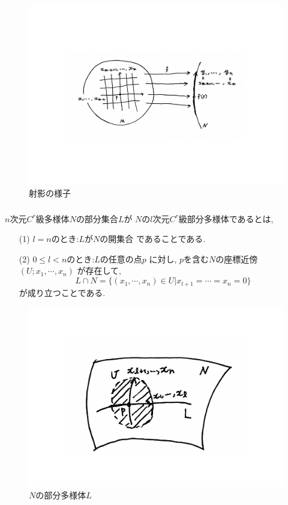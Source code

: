 \documentclass[dvipdfmx,cjk]{beamer}
\theoremstyle{definition}
\begin{document}
\begin{frame}
  \frametitle{}
  \begin{figure}[H]
    \centering
    \includegraphics[keepaspectratio, scale=0.5]{projectionTheorem.pdf}
    \caption{射影の様子}
    \label{projectionTheorem}
   \end{figure}
\end{frame}
\begin{frame}
  \frametitle{}
  \begin{definition}\label{def:C^r-submanifold}
    $n$次元$C^r$級多様体$N$の部分集合$L$が
    $N$の$l$次元$C^r$級部分多様体であるとは, 
    \begin{itemize}
        \item[(1)]$l=n$のとき:$L$が$N$の開集合
        であることである. 
        \item[(2)] $0\leq l<n$のとき:$L$の任意の点$p$
        に対し, $p$を含む$N$の座標近傍$(U;x_1,\cdots ,x_n)$
        が存在して, 
        $$L\cap N=\{(x_1,\cdots ,x_n)\in U|
        x_{l+1}=\cdots =x_n=0\}$$
        が成り立つことである. 
    \end{itemize}
\end{definition}
\begin{figure}[H]
    \centering
    \includegraphics[keepaspectratio, scale=0.2]{CrSubmanifold.pdf}
    \caption{$N$の部分多様体$L$}
    \label{CrSubmanifold}
   \end{figure}
\end{frame}
\end{document}

